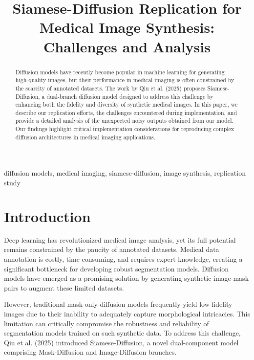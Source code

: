 \documentclass[conference]{IEEEtran}
\begin{document}
\title{Siamese-Diffusion Replication for Medical Image Synthesis: Challenges and Analysis\\}

\author{
\IEEEauthorblockA{}
\and
{}
\and
{}
\IEEEauthorblockA{}
\and
{}
\IEEEauthorblockA{}
\and
{}
\IEEEauthorblockA{}
}

\maketitle

\begin{abstract}
Diffusion models have recently become popular in machine learning for generating high-quality images, but their performance in medical imaging is often constrained by the scarcity of annotated datasets. The work by Qiu et al. (2025) proposes Siamese-Diffusion, a dual-branch diffusion model designed to address this challenge by enhancing both the fidelity and diversity of synthetic medical images. In this paper, we describe our replication efforts, the challenges encountered during implementation, and provide a detailed analysis of the unexpected noisy outputs obtained from our model. Our findings highlight critical implementation considerations for reproducing complex diffusion architectures in medical imaging applications.
\end{abstract}

\begin{IEEEkeywords}
diffusion models, medical imaging, siamese-diffusion, image synthesis, replication study
\end{IEEEkeywords}

\section{Introduction}
Deep learning has revolutionized medical image analysis, yet its full potential remains constrained by the paucity of annotated datasets. Medical data annotation is costly, time-consuming, and requires expert knowledge, creating a significant bottleneck for developing robust segmentation models. Diffusion models have emerged as a promising solution by generating synthetic image-mask pairs to augment these limited datasets.

However, traditional mask-only diffusion models frequently yield low-fidelity images due to their inability to adequately capture morphological intricacies. This limitation can critically compromise the robustness and reliability of segmentation models trained on such synthetic data. To address this challenge, Qiu et al. (2025) introduced Siamese-Diffusion, a novel dual-component model comprising Mask-Diffusion and Image-Diffusion branches.
\end{document}
